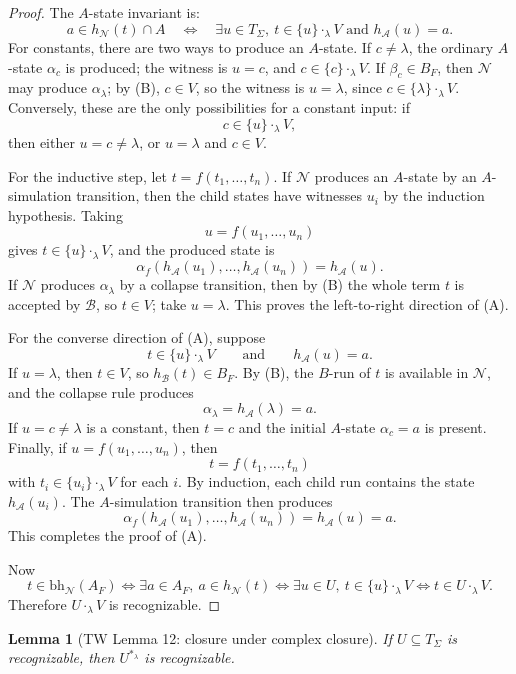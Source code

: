 \documentclass[11pt]{article}
\newtheorem{lemma}[theorem]{Lemma}
\theoremstyle{definition}
\newcommand{\SigmaSym}{\Sigma}
\newcommand{\Term}[1]{T_{#1}}
\newcommand{\Aut}{\mathcal A}
\newcommand{\bh}{\mathrm{bh}}
\begin{document}
\begin{proof}
The \(A\)-state invariant is:
\[
  a\in h_{\mathcal N}(t)\cap A
  \quad\Longleftrightarrow\quad
  \exists u\in\Term{\SigmaSym},\
    t\in\{u\}\cdot_\lambda V
    \text{ and } h_\Aut(u)=a.                \tag{A}
\]
For constants, there are two ways to produce an \(A\)-state.  If
\(c\ne\lambda\), the ordinary \(A\)-state \(\alpha_c\) is produced; the witness
is \(u=c\), and \(c\in\{c\}\cdot_\lambda V\).  If \(\beta_c\in B_F\), then
\(\mathcal N\) may produce \(\alpha_\lambda\); by (B), \(c\in V\), so the witness
is \(u=\lambda\), since \(c\in\{\lambda\}\cdot_\lambda V\).  Conversely, these
are the only possibilities for a constant input: if
\[
  c\in\{u\}\cdot_\lambda V,
\]
then either \(u=c\ne\lambda\), or \(u=\lambda\) and \(c\in V\).

For the inductive step, let \(t=f(t_1,\ldots,t_n)\).  If \(\mathcal N\) produces
an \(A\)-state by an \(A\)-simulation transition, then the child states have
witnesses \(u_i\) by the induction hypothesis.  Taking
\[
  u=f(u_1,\ldots,u_n)
\]
gives \(t\in\{u\}\cdot_\lambda V\), and the produced state is
\[
  \alpha_f(h_\Aut(u_1),\ldots,h_\Aut(u_n))=h_\Aut(u).
\]
If \(\mathcal N\) produces \(\alpha_\lambda\) by a collapse transition, then by
(B) the whole term \(t\) is accepted by \(\mathcal B\), so \(t\in V\); take
\(u=\lambda\).  This proves the left-to-right direction of (A).

For the converse direction of (A), suppose
\[
  t\in\{u\}\cdot_\lambda V
  \qquad\text{and}\qquad
  h_\Aut(u)=a.
\]
If \(u=\lambda\), then \(t\in V\), so \(h_{\mathcal B}(t)\in B_F\).  By (B), the
\(B\)-run of \(t\) is available in \(\mathcal N\), and the collapse rule produces
\[
  \alpha_\lambda=h_\Aut(\lambda)=a.
\]
If \(u=c\ne\lambda\) is a constant, then \(t=c\) and the initial \(A\)-state
\(\alpha_c=a\) is present.  Finally, if \(u=f(u_1,\ldots,u_n)\), then
\[
  t=f(t_1,\ldots,t_n)
\]
with \(t_i\in\{u_i\}\cdot_\lambda V\) for each \(i\).  By induction, each child
run contains the state \(h_\Aut(u_i)\).  The \(A\)-simulation transition then
produces
\[
  \alpha_f(h_\Aut(u_1),\ldots,h_\Aut(u_n))
  =
  h_\Aut(u)
  =
  a.
\]
This completes the proof of (A).

Now
\[
  t\in\bh_{\mathcal N}(A_F)
  \Longleftrightarrow
  \exists a\in A_F,\ a\in h_{\mathcal N}(t)
  \Longleftrightarrow
  \exists u\in U,\ t\in\{u\}\cdot_\lambda V
  \Longleftrightarrow
  t\in U\cdot_\lambda V.
\]
Therefore \(U\cdot_\lambda V\) is recognizable.
\end{proof}

\begin{lemma}[TW Lemma 12: closure under complex closure]\label{lem:tw-complex-closure}
If \(U\subseteq\Term{\SigmaSym}\) is recognizable, then \(U^{*_\lambda}\) is
recognizable.
\end{lemma}
\end{document}
